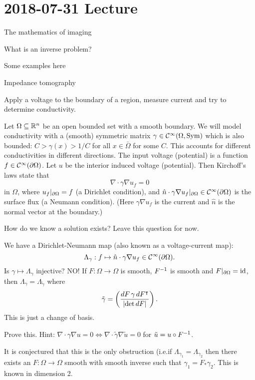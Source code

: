 \section{2018-07-31 Lecture}

The mathematics of imaging

What is an inverse problem?

Some examples here

Impedance tomography

Apply a voltage to the boundary of a region, measure current and try to determine conductivity.

Let $\Omega \subseteq \mathbb{R}^n$ be an open bounded set with a smooth boundary.
We will model conductivity with a (smooth) symmetric matrix $\gamma \in \mathcal{C}^\infty(\Omega,\operatorname{Sym})$ which is also bounded: $C > \gamma(x)> 1/C$ for all $x \in \bar\Omega$ for some $C$.
This accounts for different conductivities in different directions.
The input voltage (potential) is a function $f \in \mathcal{C}^\infty(\partial\Omega)$.
Let $u$ be the interior induced voltage (potential).
Then Kirchoff's laws state that
\[ \nabla \cdot \gamma \nabla u_f = 0 \]
in $\Omega$, where $u_f|_{\partial\Omega} = f$ (a Dirichlet condition), and $\hat n \cdot \gamma \nabla u_f|_{\partial\Omega} \in \mathcal{C}^\infty(\partial\Omega)$ is the surface flux (a Neumann condition).
(Here $\gamma\nabla u_f$ is the current and $\hat n$ is the normal vector at the boundary.)

How do we know a solution exists?
Leave this question for now.

We have a Dirichlet-Neumann map (also known as a voltage-current map):
\[ \Lambda_\gamma: f \mapsto \hat n \cdot \gamma \nabla u_f \in \mathcal{C}^\infty(\partial\Omega). \]
Is $\gamma \mapsto \Lambda_\gamma$ injective?
NO!
If $F: \Omega \to \Omega$ is smooth,  $F^{-1}$ is smooth and $F|_{\partial\Omega}=\operatorname{id}$, then $\Lambda_\gamma = \Lambda_{\tilde\gamma}$ where
\[ \tilde\gamma = \left( \frac{dF \, \gamma \, dF^\intercal}{\left\lvert \det dF \right\rvert} \right). \]
This is just a change of basis.

\begin{exer}
  Prove this.
  Hint: $\nabla \cdot \gamma \nabla u = 0 \iff \nabla \cdot \tilde \gamma \nabla \tilde u = 0$ for $\tilde u = u \circ F^{-1}$.
\end{exer}

It is conjectured that this is the only obstruction (i.e.\@ if $\Lambda_{\gamma_1}=\Lambda_{\gamma_2}$ then there exists an $F: \Omega \to \Omega$ smooth with smooth inverse such that $\gamma_1 = F_* \gamma_2$.
This is known in dimension 2.

